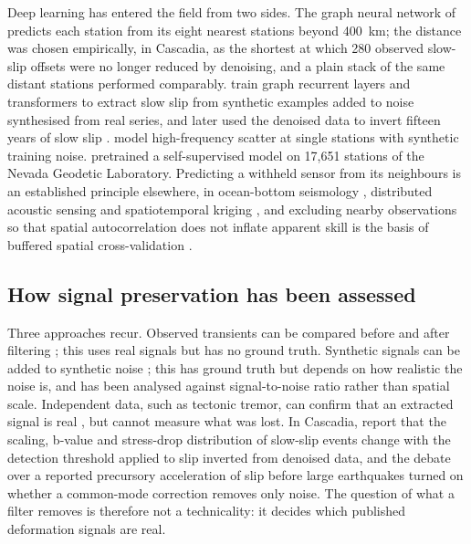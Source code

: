 \documentclass[preprint,12pt,authoryear]{elsarticle}
\begin{document}
Deep learning has entered the field from two sides. The graph neural network of \citet{bachelot2025} predicts each station from its eight nearest stations beyond 400~km; the distance was chosen empirically, in Cascadia, as the shortest at which 280 observed slow-slip offsets were no longer reduced by denoising, and a plain stack of the same distant stations performed comparably. \citet{costantino2024} train graph recurrent layers and transformers to extract slow slip from synthetic examples added to noise synthesised from real series, and later used the denoised data to invert fifteen years of slow slip \citep{costantino2026}. \citet{mastella2025} model high-frequency scatter at single stations with synthetic training noise. \citet{teutschmann2026} pretrained a self-supervised model on 17,651 stations of the Nevada Geodetic Laboratory. Predicting a withheld sensor from its neighbours is an established principle elsewhere, in ocean-bottom seismology \citep{crawfordwebb2000, janiszewski2019}, distributed acoustic sensing \citep{batson2019, vandenende2023} and spatiotemporal kriging \citep{wu2021ignnk, cini2022grin, marisca2022spin}, and excluding nearby observations so that spatial autocorrelation does not inflate apparent skill is the basis of buffered spatial cross-validation \citep{lerest2014}.

\subsection{How signal preservation has been assessed}

Three approaches recur. Observed transients can be compared before and after filtering \citep{bachelot2025}; this uses real signals but has no ground truth. Synthetic signals can be added to synthetic noise \citep{costantino2024, mastella2025}; this has ground truth but depends on how realistic the noise is, and has been analysed against signal-to-noise ratio rather than spatial scale. Independent data, such as tectonic tremor, can confirm that an extracted signal is real \citep{costantino2024}, but cannot measure what was lost. In Cascadia, \citet{costantino2026} report that the scaling, b-value and stress-drop distribution of slow-slip events change with the detection threshold applied to slip inverted from denoised data, and the debate over a reported precursory acceleration of slip before large earthquakes \citep{bletery2023, bletery2025} turned on whether a common-mode correction removes only noise. The question of what a filter removes is therefore not a technicality: it decides which published deformation signals are real.
\end{document}
